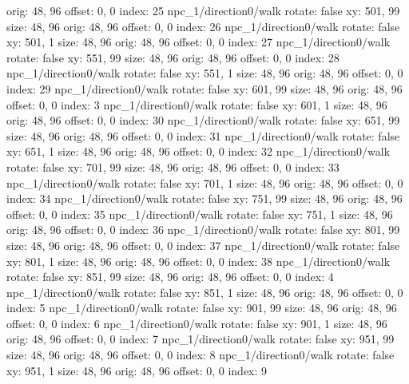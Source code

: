   orig: 48, 96
  offset: 0, 0
  index: 25
npc_1/direction0/walk
  rotate: false
  xy: 501, 99
  size: 48, 96
  orig: 48, 96
  offset: 0, 0
  index: 26
npc_1/direction0/walk
  rotate: false
  xy: 501, 1
  size: 48, 96
  orig: 48, 96
  offset: 0, 0
  index: 27
npc_1/direction0/walk
  rotate: false
  xy: 551, 99
  size: 48, 96
  orig: 48, 96
  offset: 0, 0
  index: 28
npc_1/direction0/walk
  rotate: false
  xy: 551, 1
  size: 48, 96
  orig: 48, 96
  offset: 0, 0
  index: 29
npc_1/direction0/walk
  rotate: false
  xy: 601, 99
  size: 48, 96
  orig: 48, 96
  offset: 0, 0
  index: 3
npc_1/direction0/walk
  rotate: false
  xy: 601, 1
  size: 48, 96
  orig: 48, 96
  offset: 0, 0
  index: 30
npc_1/direction0/walk
  rotate: false
  xy: 651, 99
  size: 48, 96
  orig: 48, 96
  offset: 0, 0
  index: 31
npc_1/direction0/walk
  rotate: false
  xy: 651, 1
  size: 48, 96
  orig: 48, 96
  offset: 0, 0
  index: 32
npc_1/direction0/walk
  rotate: false
  xy: 701, 99
  size: 48, 96
  orig: 48, 96
  offset: 0, 0
  index: 33
npc_1/direction0/walk
  rotate: false
  xy: 701, 1
  size: 48, 96
  orig: 48, 96
  offset: 0, 0
  index: 34
npc_1/direction0/walk
  rotate: false
  xy: 751, 99
  size: 48, 96
  orig: 48, 96
  offset: 0, 0
  index: 35
npc_1/direction0/walk
  rotate: false
  xy: 751, 1
  size: 48, 96
  orig: 48, 96
  offset: 0, 0
  index: 36
npc_1/direction0/walk
  rotate: false
  xy: 801, 99
  size: 48, 96
  orig: 48, 96
  offset: 0, 0
  index: 37
npc_1/direction0/walk
  rotate: false
  xy: 801, 1
  size: 48, 96
  orig: 48, 96
  offset: 0, 0
  index: 38
npc_1/direction0/walk
  rotate: false
  xy: 851, 99
  size: 48, 96
  orig: 48, 96
  offset: 0, 0
  index: 4
npc_1/direction0/walk
  rotate: false
  xy: 851, 1
  size: 48, 96
  orig: 48, 96
  offset: 0, 0
  index: 5
npc_1/direction0/walk
  rotate: false
  xy: 901, 99
  size: 48, 96
  orig: 48, 96
  offset: 0, 0
  index: 6
npc_1/direction0/walk
  rotate: false
  xy: 901, 1
  size: 48, 96
  orig: 48, 96
  offset: 0, 0
  index: 7
npc_1/direction0/walk
  rotate: false
  xy: 951, 99
  size: 48, 96
  orig: 48, 96
  offset: 0, 0
  index: 8
npc_1/direction0/walk
  rotate: false
  xy: 951, 1
  size: 48, 96
  orig: 48, 96
  offset: 0, 0
  index: 9

